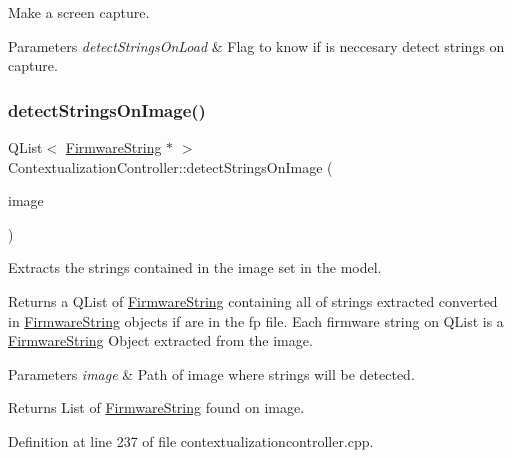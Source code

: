 Make a screen capture. 


\begin{DoxyParams}{Parameters}
{\em detect\+Strings\+On\+Load} & Flag to know if is neccesary detect strings on capture. \\
\hline
\end{DoxyParams}
\mbox{\label{classContextualizationController_ae6817457c7b00d17bb676a4989d59858}} 
\subsubsection{\texorpdfstring{detect\+Strings\+On\+Image()}{detectStringsOnImage()}}
{\footnotesize\ttfamily Q\+List$<$ \mbox{\hyperlink{classFirmwareString}{Firmware\+String}} $\ast$ $>$ Contextualization\+Controller\+::detect\+Strings\+On\+Image (\begin{DoxyParamCaption}\item[{Q\+String}]{image }\end{DoxyParamCaption})\hspace{0.3cm}{\ttfamily [protected]}}



Extracts the strings contained in the image set in the model. 

Returns a Q\+List of \mbox{\hyperlink{classFirmwareString}{Firmware\+String}} containing all of strings extracted converted in \mbox{\hyperlink{classFirmwareString}{Firmware\+String}} objects if are in the fp file. Each firmware string on Q\+List is a \mbox{\hyperlink{classFirmwareString}{Firmware\+String}} Object extracted from the image. 
\begin{DoxyParams}{Parameters}
{\em image} & Path of image where strings will be detected. \\
\hline
\end{DoxyParams}
\begin{DoxyReturn}{Returns}
List of \mbox{\hyperlink{classFirmwareString}{Firmware\+String}} found on image. 
\end{DoxyReturn}


Definition at line 237 of file contextualizationcontroller.\+cpp.

\mbox{\label{classContextualizationController_a43b14faa02f64178e6f18f94022447fa}} 
